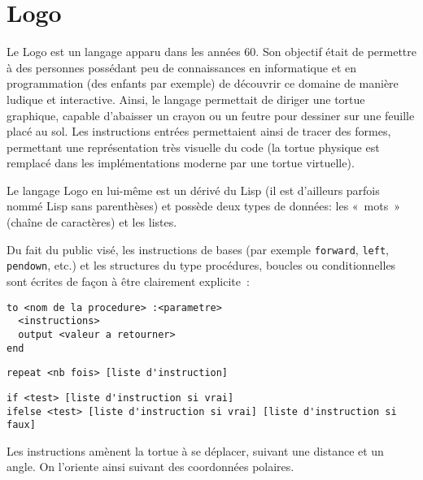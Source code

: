 \section{Logo}
\label{Logo}

Le Logo est un langage apparu dans les années 60. Son objectif était de permettre à des personnes possédant peu de connaissances en informatique et en programmation (des enfants par exemple) de découvrir ce domaine de manière ludique et interactive. Ainsi, le langage permettait de diriger une tortue graphique, capable d'abaisser un crayon ou un feutre pour dessiner sur une feuille placé au sol. Les instructions entrées permettaient ainsi de tracer des formes, permettant une représentation très visuelle du code (la tortue physique est remplacé dans les implémentations moderne par une tortue virtuelle).

Le langage Logo en lui-même est un dérivé du Lisp (il est d'ailleurs parfois nommé Lisp sans parenthèses) et possède deux types de données: les «~mots~» (chaîne de caractères) et les listes.

Du fait du public visé, les instructions de bases (par exemple \verb|forward|, \verb|left|, \verb|pendown|, etc.) et les structures du type procédures, boucles ou conditionnelles sont écrites de façon à être clairement explicite~:

\begin{lstlisting}
to <nom de la procedure> :<parametre>
  <instructions>
  output <valeur a retourner>
end
\end{lstlisting}

\begin{lstlisting}
repeat <nb fois> [liste d'instruction]
\end{lstlisting}

\begin{lstlisting}
if <test> [liste d'instruction si vrai]
ifelse <test> [liste d'instruction si vrai] [liste d'instruction si faux]
\end{lstlisting}

Les instructions amènent la tortue à se déplacer, suivant une distance et un angle. On l'oriente ainsi suivant des coordonnées polaires.
